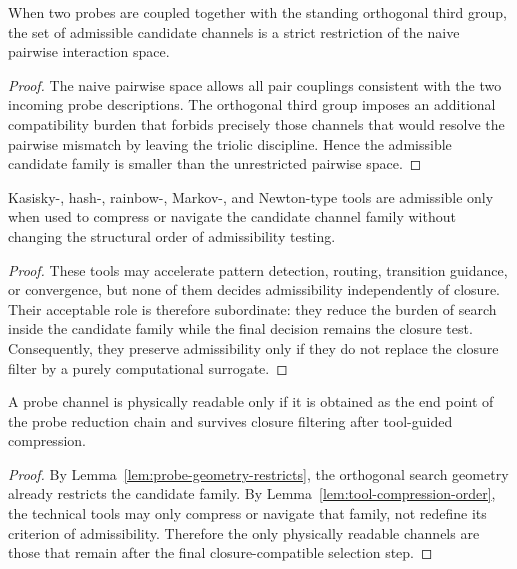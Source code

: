 \begin{lemma}
\label{lem:probe-geometry-restricts}
When two probes are coupled together with the standing orthogonal third group,
the set of admissible candidate channels is a strict restriction of the naive
pairwise interaction space.
\end{lemma}

\begin{proof}
The naive pairwise space allows all pair couplings consistent with the two
incoming probe descriptions. The orthogonal third group imposes an additional
compatibility burden that forbids precisely those channels that would resolve
the pairwise mismatch by leaving the triolic discipline. Hence the admissible
candidate family is smaller than the unrestricted pairwise space.
\end{proof}

\begin{lemma}
\label{lem:tool-compression-order}
Kasisky-, hash-, rainbow-, Markov-, and Newton-type tools are admissible only
when used to compress or navigate the candidate channel family without changing
the structural order of admissibility testing.
\end{lemma}

\begin{proof}
These tools may accelerate pattern detection, routing, transition guidance, or
convergence, but none of them decides admissibility independently of closure.
Their acceptable role is therefore subordinate: they reduce the burden of
search inside the candidate family while the final decision remains the closure
test. Consequently, they preserve admissibility only if they do not replace the
closure filter by a purely computational surrogate.
\end{proof}

\begin{proposition}
\label{prop:probe-reduction-principle}
A probe channel is physically readable only if it is obtained as the end point
of the probe reduction chain and survives closure filtering after tool-guided
compression.
\end{proposition}

\begin{proof}
By Lemma~\ref{lem:probe-geometry-restricts}, the orthogonal search geometry
already restricts the candidate family. By Lemma~\ref{lem:tool-compression-order},
the technical tools may only compress or navigate that family, not redefine its
criterion of admissibility. Therefore the only physically readable channels are
those that remain after the final closure-compatible selection step.
\end{proof}

